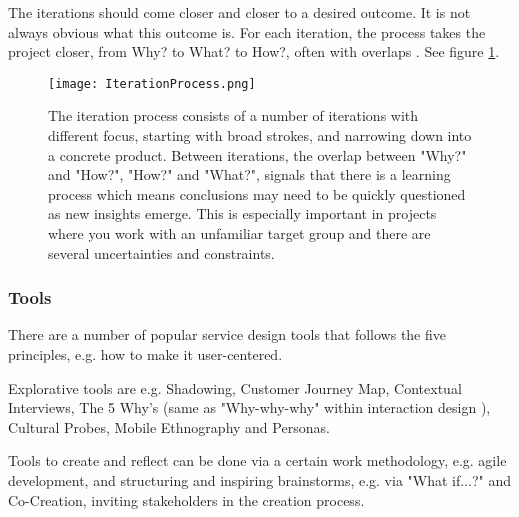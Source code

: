 The iterations should come closer and closer to a desired outcome. It is not always obvious what this outcome is. For each iteration, the process takes the project closer, from Why? to What? to How?, often with overlaps \cite{expedition-mondial}. See figure \ref{fig:iterationprocess}.


\begin{figure}[h]
    \centering
    \texttt{[image: IterationProcess.png]}
    \caption{The iteration process consists of a number of iterations with different focus, starting with broad strokes, and narrowing down into a concrete product. Between iterations, the overlap between "Why?" and "How?", "How?" and "What?", signals that there is a learning process which means conclusions may need to be quickly questioned as new insights emerge. This is especially important in projects where you work with an unfamiliar target group and there are several uncertainties and constraints.}
    \label{fig:iterationprocess}
\end{figure}

\subsubsection{Tools}

There are a number of popular service design tools that follows the five principles, e.g. how to make it user-centered.

Explorative tools are e.g. Shadowing, Customer Journey Map, Contextual Interviews, The 5 Why's (same as "Why-why-why" within interaction design \cite{thoughtful}), Cultural Probes, Mobile Ethnography and Personas.

Tools to create and reflect can be done via a certain work methodology, e.g. agile development, and structuring and inspiring brainstorms, e.g. via "What if...?" and Co-Creation, inviting stakeholders in the creation process.

%


%

%
